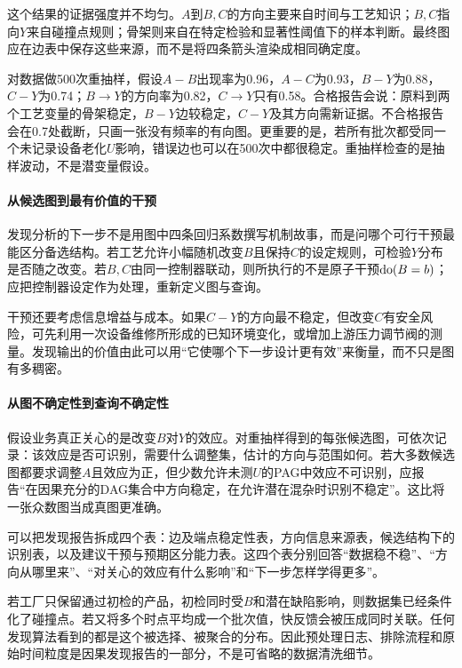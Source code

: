 这个结果的证据强度并不均匀。$A$到$B,C$的方向主要来自时间与工艺知识；$B,C$指向$Y$来自碰撞点规则；骨架则来自在特定检验和显著性阈值下的样本判断。最终图应在边表中保存这些来源，而不是将四条箭头渲染成相同确定度。

\begin{workedexample}[稳定性不等于真实性]
对数据做500次重抽样，假设$A-B$出现率为0.96，$A-C$为0.93，$B-Y$为0.88，$C-Y$为0.74；$B\rightarrow Y$的方向率为0.82，$C\rightarrow Y$只有0.58。合格报告会说：原料到两个工艺变量的骨架稳定，$B-Y$边较稳定，$C-Y$及其方向需新证据。不合格报告会在0.7处截断，只画一张没有频率的有向图。更重要的是，若所有批次都受同一个未记录设备老化$U$影响，错误边也可以在500次中都很稳定。重抽样检查的是抽样波动，不是潜变量假设。
\end{workedexample}

\paragraph{从候选图到最有价值的干预}

发现分析的下一步不是用图中四条回归系数撰写机制故事，而是问哪个可行干预最能区分备选结构。若工艺允许小幅随机改变$B$且保持$C$的设定规则，可检验$Y$分布是否随之改变。若$B,C$由同一控制器联动，则所执行的不是原子干预$\operatorname{do}(B=b)$；应把控制器设定作为处理，重新定义图与查询。

干预还要考虑信息增益与成本。如果$C-Y$的方向最不稳定，但改变$C$有安全风险，可先利用一次设备维修所形成的已知环境变化，或增加上游压力调节阀的测量。发现输出的价值由此可以用“它使哪个下一步设计更有效”来衡量，而不只是图有多稠密。

\paragraph{从图不确定性到查询不确定性}

假设业务真正关心的是改变$B$对$Y$的效应。对重抽样得到的每张候选图，可依次记录：该效应是否可识别，需要什么调整集，估计的方向与范围如何。若大多数候选图都要求调整$A$且效应为正，但少数允许未测$U$的PAG中效应不可识别，应报告“在因果充分的DAG集合中方向稳定，在允许潜在混杂时识别不稳定”。这比将一张众数图当成真图更准确。

可以把发现报告拆成四个表：边及端点稳定性表，方向信息来源表，候选结构下的识别表，以及建议干预与预期区分能力表。这四个表分别回答“数据稳不稳”、“方向从哪里来”、“对关心的效应有什么影响”和“下一步怎样学得更多”。

\begin{failurecheck}[数据预处理在图之前已经定向]
若工厂只保留通过初检的产品，初检同时受$B$和潜在缺陷影响，则数据集已经条件化了碰撞点。若又将多个时点平均成一个批次值，快反馈会被压成同时关联。任何发现算法看到的都是这个被选择、被聚合的分布。因此预处理日志、排除流程和原始时间粒度是因果发现报告的一部分，不是可省略的数据清洗细节。
\end{failurecheck}

